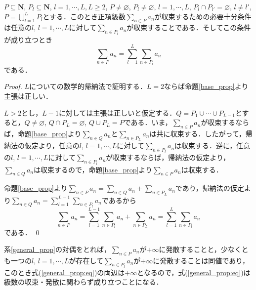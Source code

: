 \documentclass[12pt,a4paper]{jsarticle}
\newcommand{\nat}{\mathbf{N}}
\begin{document}
\begin{corollary}\label{general_prop}
    $P \subseteq \nat$, $P_l \subseteq \nat$, $l = 1, \cdots, L, L \geq 2$, $P \not= \varnothing$, $P_l \not= \varnothing$, $l = 1, \cdots, L$, $P_l \cap P_{l'} = \varnothing$, $l \not= l'$, $P = \bigcup_{l = 1}^L P_l$とする．このとき正項級数$\sum_{n \in P} a_n$が収束するための必要十分条件は任意の$l$, $l = 1, \cdots, L$に対して$\sum_{n \in P_l} a_n$が収束することである．そしてこの条件が成り立つとき
    \begin{equation}
        \sum_{n \in P} a_n = \sum_{l = 1}^L \sum_{n \in P_l} a_n \label{general_prop:eq}
    \end{equation}
    である．
\end{corollary}
\begin{proof}
    $L$についての数学的帰納法で証明する．$L = 2$ならば命題\ref{base_prop}より主張は正しい．

    $L > 2$とし，$L - 1$に対しては主張は正しいと仮定する．$Q = P_1 \cup \cdots \cup P_{L - 1}$とすると，$Q \not= \varnothing$, $Q \cap P_L = \varnothing$, $Q \cup P_L = P$である．いま，$\sum_{n \in P} a_n$が収束するならば，命題\ref{base_prop}より$\sum_{n \in Q} a_n$と$\sum_{n \in P_L} a_n$は共に収束する．したがって，帰納法の仮定より，任意の$l$, $l = 1, \cdots, L$に対して$\sum_{n \in P_l} a_n$は収束する．逆に，任意の$l$, $l = 1, \cdots, L$に対して$\sum_{n \in P_l} a_n$が収束するならば，帰納法の仮定より，$\sum_{n \in Q} a_n$は収束するので，命題\ref{base_prop}より$\sum_{n \in P} a_n$は収束する．

    命題\ref{base_prop}より$\sum_{n \in P} a_n = \sum_{n \in Q} a_n + \sum_{n \in P_L} a_n$であり，帰納法の仮定より$\sum_{n \in Q} a_n = \sum_{l = 1}^{L - 1} \sum_{n \in P_l} a_n$であるから
    \begin{equation*}
        \sum_{n \in P} a_n = \sum_{l = 1}^{L - 1} \sum_{n \in P_l} a_n + \sum_{n \in P_L} a_n = \sum_{l = 1}^L \sum_{n \in P_l} a_n
    \end{equation*}
    である．
    \qed
\end{proof}

系\ref{general_prop}の対偶をとれば，$\sum_{n \in P} a_n$が$+\infty$に発散することと，少なくとも一つの$l$, $l = 1, \cdots, L$が存在して$\sum_{n \in P_l} a_n$が$+\infty$に発散することは同値であり，このとき式(\ref{general_prop:eq})の両辺は$+\infty$となるので，式(\ref{general_prop:eq})は級数の収束・発散に関わらず成り立つことになる．
\end{document}
